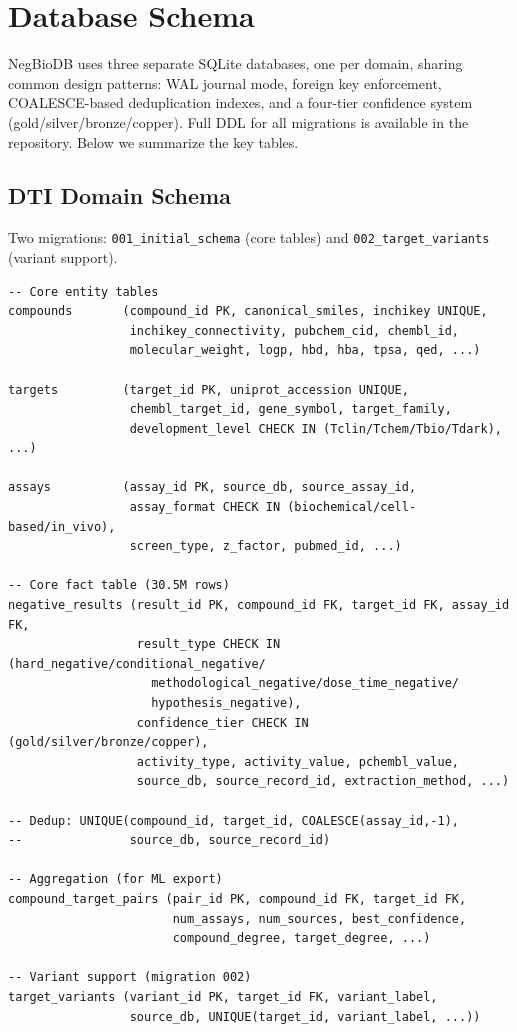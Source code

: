 \section{Database Schema}
\label{app:schema}

NegBioDB uses three separate SQLite databases, one per domain, sharing common design patterns: WAL journal mode, foreign key enforcement, COALESCE-based deduplication indexes, and a four-tier confidence system (gold/silver/bronze/copper). Full DDL for all migrations is available in the repository. Below we summarize the key tables.

\subsection{DTI Domain Schema}

Two migrations: \texttt{001\_initial\_schema} (core tables) and \texttt{002\_target\_variants} (variant support).

\begin{small}
\begin{verbatim}
-- Core entity tables
compounds       (compound_id PK, canonical_smiles, inchikey UNIQUE,
                 inchikey_connectivity, pubchem_cid, chembl_id,
                 molecular_weight, logp, hbd, hba, tpsa, qed, ...)

targets         (target_id PK, uniprot_accession UNIQUE,
                 chembl_target_id, gene_symbol, target_family,
                 development_level CHECK IN (Tclin/Tchem/Tbio/Tdark), ...)

assays          (assay_id PK, source_db, source_assay_id,
                 assay_format CHECK IN (biochemical/cell-based/in_vivo),
                 screen_type, z_factor, pubmed_id, ...)

-- Core fact table (30.5M rows)
negative_results (result_id PK, compound_id FK, target_id FK, assay_id FK,
                  result_type CHECK IN (hard_negative/conditional_negative/
                    methodological_negative/dose_time_negative/
                    hypothesis_negative),
                  confidence_tier CHECK IN (gold/silver/bronze/copper),
                  activity_type, activity_value, pchembl_value,
                  source_db, source_record_id, extraction_method, ...)

-- Dedup: UNIQUE(compound_id, target_id, COALESCE(assay_id,-1),
--               source_db, source_record_id)

-- Aggregation (for ML export)
compound_target_pairs (pair_id PK, compound_id FK, target_id FK,
                       num_assays, num_sources, best_confidence,
                       compound_degree, target_degree, ...)

-- Variant support (migration 002)
target_variants (variant_id PK, target_id FK, variant_label,
                 source_db, UNIQUE(target_id, variant_label, ...))
\end{verbatim}
\end{small}

